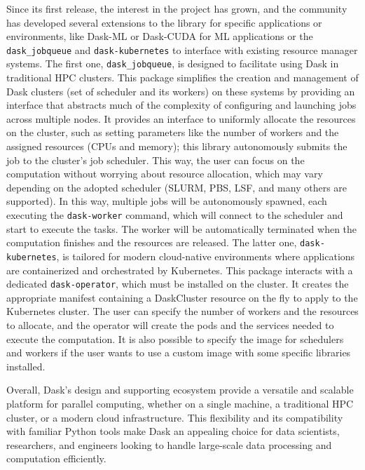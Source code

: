 Since its first release, the interest in the project has grown, and the
community has developed several extensions to the library for specific
applications or environments, like Dask-ML or Dask-CUDA for ML applications or
the \texttt{dask\_jobqueue} and \texttt{dask-kubernetes} to interface with
existing resource manager systems.  The first one, \texttt{dask\_jobqueue}, is
designed to facilitate using Dask in traditional HPC clusters. This package
simplifies the creation and management of Dask clusters (set of scheduler and
its workers) on these systems by providing an interface that abstracts much of
the complexity of configuring and launching jobs across multiple nodes. It
provides an interface to uniformly allocate the resources on the cluster, such
as setting parameters like the number of workers and the assigned resources
(CPUs and memory); this library autonomously submits the job to the cluster's
job scheduler. This way, the user can focus on the computation without worrying
about resource allocation, which may vary depending on the adopted scheduler
(SLURM, PBS, LSF, and many others are supported). In this way, multiple jobs
will be autonomously spawned, each executing the \texttt{dask-worker} command,
which will connect to the scheduler and start to execute the tasks. The worker
will be automatically terminated when the computation finishes and the resources
are released. The latter one, \texttt{dask-kubernetes}, is tailored for modern
cloud-native environments where applications are containerized and orchestrated
by Kubernetes. This package interacts with a dedicated \texttt{dask-operator},
which must be installed on the cluster. It creates the appropriate manifest
containing a DaskCluster resource on the fly to apply to the Kubernetes cluster.
The user can specify the number of workers and the resources to allocate, and
the operator will create the pods and the services needed to execute the
computation. It is also possible to specify the image for schedulers and workers
if the user wants to use a custom image with some specific libraries installed.

Overall, Dask's design and supporting ecosystem provide a versatile and scalable
platform for parallel computing, whether on a single machine, a traditional HPC
cluster, or a modern cloud infrastructure. This flexibility and its
compatibility with familiar Python tools make Dask an appealing choice for data
scientists, researchers, and engineers looking to handle large-scale data
processing and computation efficiently.

